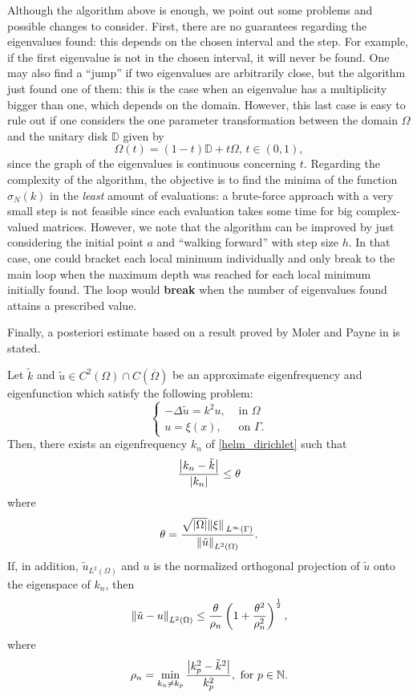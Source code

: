 \begin{remark}
    Although the algorithm above is enough, we point out some problems and possible changes to consider. First, there are no guarantees regarding the eigenvalues found: this depends on the chosen interval and the step. For example, if the first eigenvalue is not in the chosen interval, it will never be found. One may also find a ``jump'' if two eigenvalues are arbitrarily close, but the algorithm just found one of them: this is the case when an eigenvalue has a multiplicity bigger than one, which depends on the domain. However, this last case is easy to rule out if one considers the one parameter transformation between the domain \(\Omega\) and the unitary disk \(\mathbb{D}\) given by
    \[
        \Omega(t) = (1-t)\mathbb{D} + t \Omega, \, t \in (0, 1),
    \]
    since the graph of the eigenvalues is continuous concerning \(t\). Regarding the complexity of the algorithm, the objective is to find the minima of the function \(\sigma_N(k)\) in the \textit{least} amount of evaluations: a brute-force approach with a very small step is not feasible since each evaluation takes some time for big complex-valued matrices. However, we note that the algorithm can be improved by just considering the initial point \(a\) and ``walking forward'' with step size \(h\). In that case, one could bracket each local minimum individually and only break to the main loop when the maximum depth was reached for each local minimum initially found. The loop would \textbf{break} when the number of eigenvalues found attains a prescribed value.
\end{remark}

Finally, a posteriori estimate based on a result proved by Moler and Payne in \cite{moler1968bounds} is stated.
\begin{theorem}
    Let \(\tilde{k}\) and \(\tilde{u} \in C^2(\Omega) \cap C(\overline{\Omega})\) be an approximate eigenfrequency and eigenfunction which satisfy the following problem:
    \[
    \begin{cases}
        -\Delta \tilde{u} = k^2 u, &\text{ in } \Omega\\
        u = \xi(x), &\text{ on } \Gamma.
    \end{cases}    
    \]
    Then, there exists an eigenfrequency \(k_n\) of \eqref{helm_dirichlet} such that
    \[
        \frac{\abs{{k_n} - {\tilde{k}}}}{\abs{k_n}} \leq \theta
    \]
    where
    \[
        \theta = \frac{\sqrt{\abs{\Omega}} \norm*{\xi}_{L^\infty (\Gamma)}}{\norm{\tilde{u}}_{L^2(\Omega)}}.
    \]
    If, in addition, \(\tilde{u}_{L^2(\Omega)}\) and \(u\) is the normalized orthogonal projection of \(\tilde{u}\) onto the eigenspace of \(k_n\), then
    \[
        \norm{\tilde{u} - u}_{L^2(\Omega)} \leq \frac{\theta}{\rho_n}\left(1+\frac{\theta^2}{\rho_n^2}\right)^\frac{1}{2},
    \]
    where
    \[
        \rho_n = \min_{k_n \neq k_p} \frac{\abs{k^2_p - \tilde{k}^2}}{k^2_p}, \text{ for } p \in \mathbb{N}.
    \]
\end{theorem}

